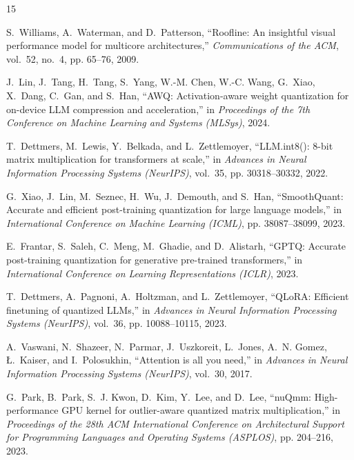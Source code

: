 \documentclass[conference]{IEEEtran}
\begin{document}
\begin{thebibliography}{15}

S.~Williams, A.~Waterman, and D.~Patterson, ``Roofline: An insightful visual performance model for multicore architectures,'' \emph{Communications of the ACM}, vol.~52, no.~4, pp. 65--76, 2009.

J.~Lin, J.~Tang, H.~Tang, S.~Yang, W.-M. Chen, W.-C. Wang, G.~Xiao, X.~Dang, C.~Gan, and S.~Han, ``AWQ: Activation-aware weight quantization for on-device LLM compression and acceleration,'' in \emph{Proceedings of the 7th Conference on Machine Learning and Systems (MLSys)}, 2024.

T.~Dettmers, M.~Lewis, Y.~Belkada, and L.~Zettlemoyer, ``LLM.int8(): 8-bit matrix multiplication for transformers at scale,'' in \emph{Advances in Neural Information Processing Systems (NeurIPS)}, vol.~35, pp. 30318--30332, 2022.

G.~Xiao, J.~Lin, M.~Seznec, H.~Wu, J.~Demouth, and S.~Han, ``SmoothQuant: Accurate and efficient post-training quantization for large language models,'' in \emph{International Conference on Machine Learning (ICML)}, pp. 38087--38099, 2023.

E.~Frantar, S.~Saleh, C.~Meng, M.~Ghadie, and D.~Alistarh, ``GPTQ: Accurate post-training quantization for generative pre-trained transformers,'' in \emph{International Conference on Learning Representations (ICLR)}, 2023.

T.~Dettmers, A.~Pagnoni, A.~Holtzman, and L.~Zettlemoyer, ``QLoRA: Efficient finetuning of quantized LLMs,'' in \emph{Advances in Neural Information Processing Systems (NeurIPS)}, vol.~36, pp. 10088--10115, 2023.

A.~Vaswani, N.~Shazeer, N.~Parmar, J.~Uszkoreit, L.~Jones, A.~N. Gomez, {\L}.~Kaiser, and I.~Polosukhin, ``Attention is all you need,'' in \emph{Advances in Neural Information Processing Systems (NeurIPS)}, vol.~30, 2017.

G.~Park, B.~Park, S.~J. Kwon, D.~Kim, Y.~Lee, and D.~Lee, ``nuQmm: High-performance GPU kernel for outlier-aware quantized matrix multiplication,'' in \emph{Proceedings of the 28th ACM International Conference on Architectural Support for Programming Languages and Operating Systems (ASPLOS)}, pp. 204--216, 2023.


\end{thebibliography}
\end{document}

